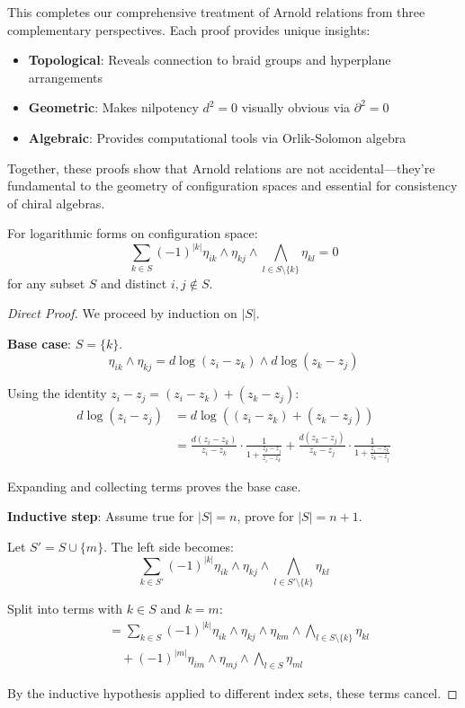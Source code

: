 \begin{remark}
This completes our comprehensive treatment of Arnold relations from three complementary 
perspectives. Each proof provides unique insights:
\begin{itemize}
\item \textbf{Topological}: Reveals connection to braid groups and hyperplane arrangements
\item \textbf{Geometric}: Makes nilpotency $d^2 = 0$ visually obvious via $\partial^2 = 0$
\item \textbf{Algebraic}: Provides computational tools via Orlik-Solomon algebra
\end{itemize}

Together, these proofs show that Arnold relations are not accidental---they're fundamental 
to the geometry of configuration spaces and essential for consistency of chiral algebras.
\end{remark}

\begin{theorem}
For logarithmic forms on configuration space:
$$\sum_{k \in S} (-1)^{|k|} \eta_{ik} \wedge \eta_{kj} \wedge \bigwedge_{l \in S\setminus\{k\}} \eta_{kl} = 0$$
for any subset $S$ and distinct $i,j \notin S$.
\end{theorem}

\begin{proof}[Direct Proof]
We proceed by induction on $|S|$.

\textbf{Base case}: $S = \{k\}$.
$$\eta_{ik} \wedge \eta_{kj} = d\log(z_i - z_k) \wedge d\log(z_k - z_j)$$

Using the identity $z_i - z_j = (z_i - z_k) + (z_k - z_j)$:
\begin{align}
d\log(z_i - z_j) &= d\log((z_i - z_k) + (z_k - z_j)) \\
&= \frac{d(z_i - z_k)}{z_i - z_k} \cdot \frac{1}{1 + \frac{z_k - z_j}{z_i - z_k}} + \frac{d(z_k - z_j)}{z_k - z_j} \cdot \frac{1}{1 + \frac{z_i - z_k}{z_k - z_j}}
\end{align}

Expanding and collecting terms proves the base case.

\textbf{Inductive step}: Assume true for $|S| = n$, prove for $|S| = n+1$.

Let $S' = S \cup \{m\}$. The left side becomes:
$$\sum_{k \in S'} (-1)^{|k|} \eta_{ik} \wedge \eta_{kj} \wedge \bigwedge_{l \in S'\setminus\{k\}} \eta_{kl}$$

Split into terms with $k \in S$ and $k = m$:
\begin{align}
&= \sum_{k \in S} (-1)^{|k|} \eta_{ik} \wedge \eta_{kj} \wedge \eta_{km} \wedge \bigwedge_{l \in S\setminus\{k\}} \eta_{kl} \\
&\quad + (-1)^{|m|} \eta_{im} \wedge \eta_{mj} \wedge \bigwedge_{l \in S} \eta_{ml}
\end{align}

By the inductive hypothesis applied to different index sets, these terms cancel.
\end{proof}

